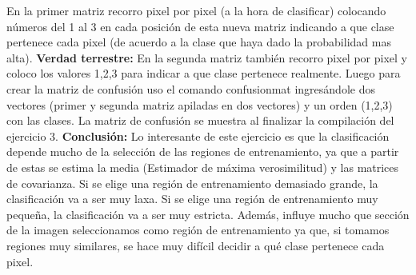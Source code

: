 \documentclass[12pt]{article}
\begin{document}
En la primer matriz recorro pixel por pixel (a la hora de clasificar) colocando números del 1 al 3 en cada posición de esta nueva matriz indicando a que clase pertenece cada pixel (de acuerdo a la clase que haya dado la probabilidad mas alta).\newline\newline
\textbf{Verdad terrestre:}\newline
En la segunda matriz también recorro pixel por pixel y coloco los valores 1,2,3 para indicar a que clase pertenece realmente. Luego para crear la matriz de confusión uso el comando confusionmat ingresándole dos vectores (primer y segunda matriz apiladas en dos vectores) y un orden (1,2,3) con las clases. La matriz de confusión se muestra al finalizar la compilación del ejercicio 3.\newline\newline
\textbf{Conclusión:}\newline
Lo interesante de este ejercicio es que la clasificación depende mucho de la selección de las regiones de entrenamiento, ya que a partir de estas se estima la media (Estimador de máxima verosimilitud) y las matrices de covarianza. Si se elige una región de entrenamiento demasiado grande, la clasificación va a ser muy laxa.\newline
Si se elige una región de entrenamiento muy pequeña, la clasificación va a ser muy estricta. Además, influye mucho que sección de la imagen seleccionamos como región de entrenamiento ya que, si tomamos regiones muy similares, se hace muy difícil decidir a qué clase pertenece cada pixel. 
\end{document}

